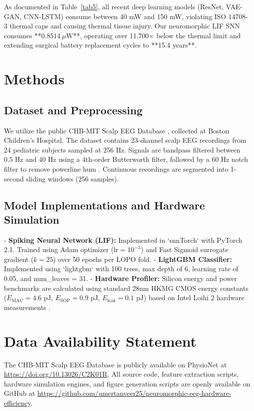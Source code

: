 \documentclass[pdflatex,sn-mathphys-num]{sn-jnl}%
\begin{document}
As documented in Table~\ref{tab5}, all recent deep learning models (ResNet, VAE-GAN, CNN-LSTM) \cite{kashefiamiri2025epileptic, ye2025cprsca, farooq2026patient} consume between 40 mW and 150 mW, violating ISO 14708-3 thermal caps and causing thermal tissue injury. Our neuromorphic LIF SNN consumes **$0.8514\ \mu\text{W}$**, operating over 11,700$\times$ below the thermal limit and extending surgical battery replacement cycles to **15.4 years**.

\section{Methods}\label{sec6}

\subsection{Dataset and Preprocessing}
We utilize the public CHB-MIT Scalp EEG Database \cite{guttag2010chb}, collected at Boston Children's Hospital. The dataset contains 23-channel scalp EEG recordings from 24 pediatric subjects sampled at 256 Hz. Signals are bandpass filtered between 0.5 Hz and 40 Hz using a 4th-order Butterworth filter, followed by a 60 Hz notch filter to remove powerline hum \cite{shoeb2010application}. Continuous recordings are segmented into 1-second sliding windows (256 samples).

\subsection{Model Implementations and Hardware Simulation}
- \textbf{Spiking Neural Network (LIF):} Implemented in `snnTorch` \cite{eshraghian2023training} with PyTorch 2.1. Trained using Adam optimizer ($\text{lr} = 10^{-3}$) and Fast Sigmoid surrogate gradient ($k = 25$) over 50 epochs per LOPO fold.
- \textbf{LightGBM Classifier:} Implemented using `lightgbm` \cite{ke2017lightgbm} with 100 trees, max depth of 6, learning rate of 0.05, and num\_leaves = 31.
- \textbf{Hardware Profiler:} Silicon energy and power benchmarks are calculated using standard 28nm HKMG CMOS energy constants ($E_{\text{MAC}} = 4.6\text{ pJ}$, $E_{\text{SOP}} = 0.9\text{ pJ}$, $E_{\text{leak}} = 0.1\text{ pJ}$) based on Intel Loihi 2 hardware measurements \cite{davies2018loihi}.

\section{Data Availability Statement}\label{sec_data}
The CHB-MIT Scalp EEG Database is publicly available on PhysioNet at \url{https://doi.org/10.13026/C2K01R}. All source code, feature extraction scripts, hardware simulation engines, and figure generation scripts are openly available on GitHub at \url{https://github.com/umertanveer25/neuromorphic-eeg-hardware-efficiency}.
\end{document}
